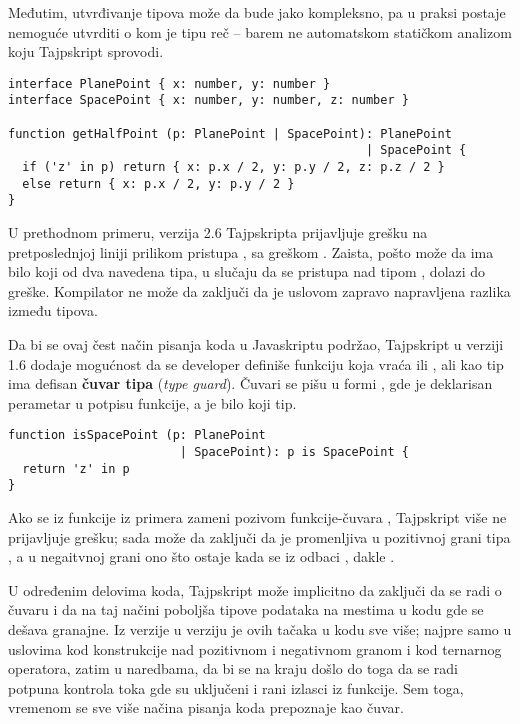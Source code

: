 Međutim, utvrđivanje tipova može da bude jako kompleksno, pa u praksi postaje nemoguće utvrditi o kom je tipu reč -- barem ne automatskom statičkom analizom koju Tajpskript sprovodi.

\begin{verbatim}
interface PlanePoint { x: number, y: number }
interface SpacePoint { x: number, y: number, z: number }

function getHalfPoint (p: PlanePoint | SpacePoint): PlanePoint
                                                  | SpacePoint {
  if ('z' in p) return { x: p.x / 2, y: p.y / 2, z: p.z / 2 }
  else return { x: p.x / 2, y: p.y / 2 }
}
\end{verbatim}

U prethodnom primeru, verzija 2.6 Tajpskripta prijavljuje grešku na pretposlednjoj liniji prilikom pristupa , sa greškom .
Zaista, pošto  može da ima bilo koji od dva navedena tipa, u slučaju da se pristupa  nad tipom , dolazi do greške.
Kompilator ne može da zaključi da je uslovom  zapravo napravljena razlika između tipova.

Da bi se ovaj čest način pisanja koda u Javaskriptu podržao, Tajpskript u verziji 1.6 dodaje mogućnost da se developer definiše funkciju koja vraća  ili , ali kao tip ima defisan \textbf{čuvar tipa} (\textsl{type guard}).
Čuvari se pišu u formi , gde je  deklarisan perametar u potpisu funkcije, a  je bilo koji tip.

\begin{verbatim}
function isSpacePoint (p: PlanePoint
                        | SpacePoint): p is SpacePoint {
  return 'z' in p
}
\end{verbatim}

Ako se  iz funkcije  iz primera zameni pozivom funkcije-čuvara , Tajpskript više ne prijavljuje grešku; sada može da zaključi da je promenljiva  u pozitivnoj grani tipa , a u negaitvnoj grani ono što ostaje kada se iz  odbaci , dakle .

U određenim delovima koda, Tajpskript može implicitno da zaključi da se radi o čuvaru i da na taj načini poboljša tipove podataka na mestima u kodu gde se dešava granajne.
Iz verzije u verziju je ovih tačaka u kodu sve više; najpre samo u uslovima kod  konstrukcije nad pozitivnom i negativnom granom i kod ternarnog operatora, zatim u  naredbama, da bi se na kraju došlo do toga da se radi potpuna kontrola toka gde su uključeni i rani izlasci iz funkcije.
Sem toga, vremenom se sve više načina pisanja koda prepoznaje kao čuvar.

